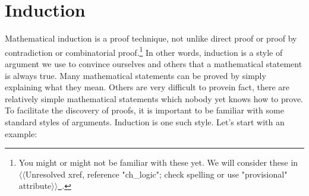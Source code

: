 \documentclass[10pt,]{book}
\theoremstyle{plain}
\theoremstyle{definition}
\theoremstyle{definition}
\theoremstyle{definition}
\theoremstyle{definition}
\numberwithin{equation}{chapter}
\begin{document}
\section[{Induction}]{Induction}\label{sec_seq-induction}
\hypertarget{p-2087}{}%
 Mathematical induction is a proof technique, not unlike direct proof or proof by contradiction or combinatorial proof.\footnote{You might or might not be familiar with these yet.  We will consider these in {$\langle\langle$Unresolved xref, reference "ch\_logic"; check spelling or use "provisional" attribute$\rangle\rangle$}\hyperlink{}{~}.\label{fn-12}} In other words, induction is a style of argument we use to convince ourselves and others that a mathematical statement is always true. Many mathematical statements can be proved by simply explaining what they mean. Others are very difficult to prove\textemdash{}in fact, there are relatively simple mathematical statements which nobody yet knows how to prove. To facilitate the discovery of proofs, it is important to be familiar with some standard styles of arguments. Induction is one such style. Let's start with an example:%
\typeout{************************************************}
\typeout{************************************************}
\end{document}
